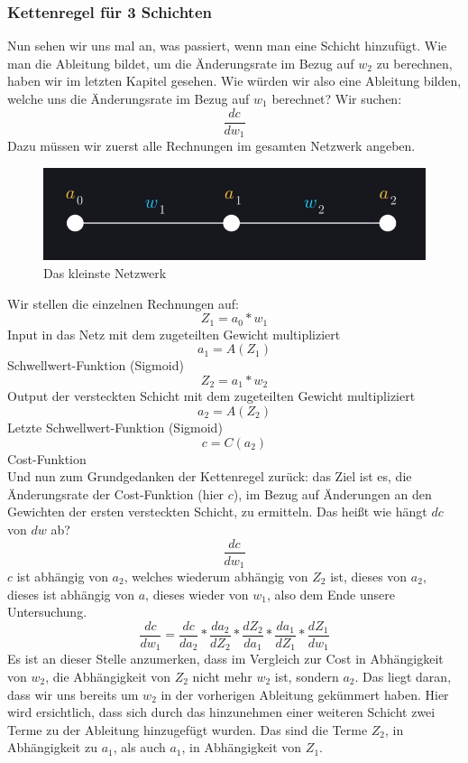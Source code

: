 \documentclass[12pt]{article}
\begin{document}
\subsubsection{Kettenregel für 3 Schichten}Nun sehen wir uns mal an, was passiert, wenn man eine Schicht hinzufügt. Wie man die Ableitung bildet, um die Änderungsrate im Bezug auf $w_2$ zu berechnen, haben wir im letzten Kapitel gesehen. Wie würden wir also eine Ableitung bilden, welche uns die Änderungsrate im Bezug auf $w_1$ berechnet?
Wir suchen:$$\frac{ dc }{ dw_{ 1 } }$$
Dazu müssen wir zuerst alle Rechnungen im gesamten Netzwerk angeben.
\begin{figure}[H]
\centering
\includegraphics[scale=0.40]{./Images/Pasted image 20230912184748.png}
\caption{Das kleinste Netzwerk}
\label{Das kleinste Netzwerk}
\end{figure}
Wir stellen die einzelnen Rechnungen auf:
$$Z_1 = a_0*w_1$$
Input in das Netz mit dem zugeteilten Gewicht multipliziert
$$a_1=A(Z_1)$$
Schwellwert-Funktion (Sigmoid)
$$Z_2=a_1*w_2$$
Output der versteckten Schicht mit dem zugeteilten Gewicht multipliziert
$$a_2=A(Z_2)$$
Letzte Schwellwert-Funktion (Sigmoid)
$$c=C(a_2)$$
Cost-Funktion \\Und nun zum Grundgedanken der Kettenregel zurück: das Ziel ist es, die Änderungsrate der Cost-Funktion (hier $c$), im Bezug auf Änderungen an den Gewichten der ersten versteckten Schicht, zu ermitteln. Das heißt wie hängt $dc$ von $dw$ ab?
$$\frac{dc}{dw_1}$$
$c$ ist abhängig von $a_2$, welches wiederum abhängig von $Z_2$ ist, dieses von $a_2$, dieses ist abhängig von $a$, dieses wieder von $w_1$, also dem Ende unsere Untersuchung.
$$\frac{ dc }{ dw_{ 1 } }=
\frac{ dc }{ da_{ 2 } }*
\frac{ da_{ 2 } }{ dZ_{ 2 } }*
\frac{ dZ_{ 2 } }{ da_{ 1 } }*
\frac{ da_{ 1 } }{ dZ_{ 1 } }*
\frac{ dZ_{ 1 } }{ dw_{ 1 } }$$
Es ist an dieser Stelle anzumerken, dass im Vergleich zur Cost in Abhängigkeit von $w_2$, die Abhängigkeit von $Z_2$ nicht mehr $w_2$ ist, sondern $a_2$. Das liegt daran, dass wir uns bereits um $w_2$ in der vorherigen Ableitung gekümmert haben.
Hier wird ersichtlich, dass sich durch das hinzunehmen einer weiteren Schicht zwei Terme zu der Ableitung hinzugefügt wurden. Das sind die Terme $Z_2$, in Abhängigkeit zu $a_1$, als auch $a_1$, in Abhängigkeit von $Z_1$. 
\end{document}
